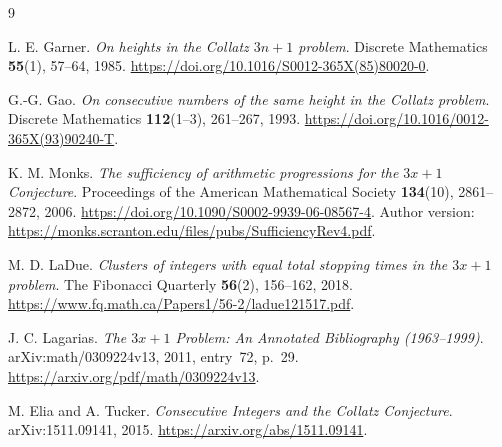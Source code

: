 \documentclass[11pt,a4paper]{article}
\begin{document}
\begin{thebibliography}{9}\small\raggedright
{} L. E. Garner.
\emph{On heights in the Collatz $3n+1$ problem}.
Discrete Mathematics \textbf{55}(1), 57--64, 1985.
\url{https://doi.org/10.1016/S0012-365X(85)80020-0}.

 G.-G. Gao.
\emph{On consecutive numbers of the same height in the Collatz problem}.
Discrete Mathematics \textbf{112}(1--3), 261--267, 1993.
\url{https://doi.org/10.1016/0012-365X(93)90240-T}.

 K. M. Monks.
\emph{The sufficiency of arithmetic progressions for the $3x+1$ Conjecture}.
Proceedings of the American Mathematical Society \textbf{134}(10),
2861--2872, 2006.
\url{https://doi.org/10.1090/S0002-9939-06-08567-4}.
Author version:
\url{https://monks.scranton.edu/files/pubs/SufficiencyRev4.pdf}.

 M. D. LaDue.
\emph{Clusters of integers with equal total stopping times in the $3x+1$ problem}.
The Fibonacci Quarterly \textbf{56}(2), 156--162, 2018.
\url{https://www.fq.math.ca/Papers1/56-2/ladue121517.pdf}.


 J. C. Lagarias.
\emph{The $3x+1$ Problem: An Annotated Bibliography (1963--1999)}.
arXiv:math/0309224v13, 2011, entry~72, p.~29.
\url{https://arxiv.org/pdf/math/0309224v13}.

 M. Elia and A. Tucker.
\emph{Consecutive Integers and the Collatz Conjecture}.
arXiv:1511.09141, 2015.
\url{https://arxiv.org/abs/1511.09141}.

\end{thebibliography}
\clearpage\appendix

\end{document}
